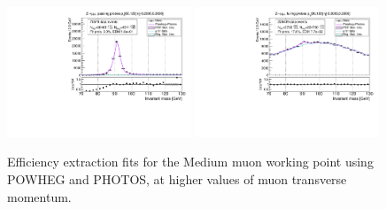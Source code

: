 {\begin{figure}
\includegraphics[width=0.49\textwidth]{figures/Zmm_PowhegPhotos_BkgLPi_pass_ptBin10_etaBin6.pdf}
\includegraphics[width=0.49\textwidth]{figures/Zmm_PowhegPhotos_BkgLPi_fail_ptBin10_etaBin6.pdf}
\caption{Efficiency extraction fits for the Medium muon working point using POWHEG and PHOTOS, at higher values of muon transverse momentum.}
\label{fig:ZmmAltSigFSRFits4}
\end{figure}

}
